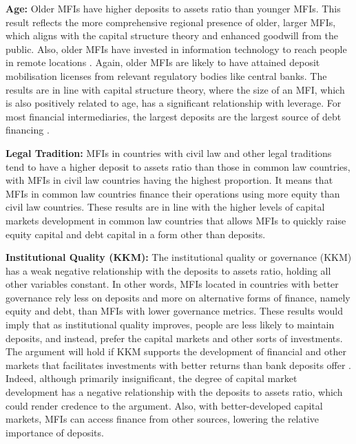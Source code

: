 \documentclass[a4paper,nobind]{templates/ociamthesis}
\begin{document}
\textbf{Age:} Older MFIs have higher deposits to assets ratio than younger MFIs. This result reflects the more comprehensive regional presence of older, larger MFIs, which aligns with the capital structure theory \autocite{barclay2005capital,barclay2006debt} and enhanced goodwill from the public. Also, older MFIs have invested in information technology to reach people in remote locations \autocite{di2021technology}. Again, older MFIs are likely to have attained deposit mobilisation licenses from relevant regulatory bodies like central banks. The results are in line with capital structure theory, where the size of an MFI, which is also positively related to age, has a significant relationship with leverage. For most financial intermediaries, the largest deposits are the largest source of debt financing \autocite{gale2020bank}.

\textbf{Legal Tradition:} MFIs in countries with civil law and other legal traditions tend to have a higher deposit to assets ratio than those in common law countries, with MFIs in civil law countries having the highest proportion. It means that MFIs in common law countries finance their operations using more equity than civil law countries. These results are in line with the higher levels of capital markets development in common law countries \autocite{la2013law,schnyder2018twenty} that allows MFIs to quickly raise equity capital and debt capital in a form other than deposits.

\textbf{Institutional Quality (KKM):} The institutional quality or governance (KKM) has a weak negative relationship with the deposits to assets ratio, holding all other variables constant. In other words, MFIs located in countries with better governance rely less on deposits and more on alternative forms of finance, namely equity and debt, than MFIs with lower governance metrics. These results would imply that as institutional quality improves, people are less likely to maintain deposits, and instead, prefer the capital markets and other sorts of investments. The argument will hold if KKM supports the development of financial and other markets that facilitates investments with better returns than bank deposits offer \autocite{la2013law,schnyder2018twenty}. Indeed, although primarily insignificant, the degree of capital market development has a negative relationship with the deposits to assets ratio, which could render credence to the argument. Also, with better-developed capital markets, MFIs can access finance from other sources, lowering the relative importance of deposits.
\end{document}
